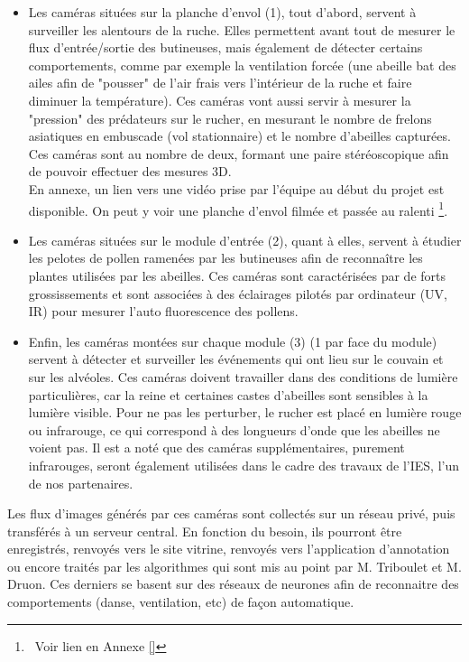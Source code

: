 \documentclass[11pt,french,a4paper]{report}
\begin{document}
\begin{itemize}
  \item Les caméras situées sur la planche d'envol (1), tout d'abord, servent à surveiller 
  les alentours de la ruche. Elles permettent avant tout de
  mesurer le flux d'entrée/sortie des butineuses, mais également de détecter
  certains comportements, comme par exemple la ventilation forcée (une abeille
  bat des ailes afin de "pousser" de l'air frais vers l'intérieur de la ruche et faire
  diminuer la température). Ces caméras vont aussi servir à mesurer la
  "pression" des prédateurs sur le rucher, en mesurant le nombre de frelons
  asiatiques en embuscade (vol stationnaire) et le nombre d'abeilles
  capturées. Ces caméras sont au nombre de deux, formant une paire
  stéréoscopique afin de pouvoir effectuer des mesures 3D. \\
  En annexe, un lien vers une vidéo prise par l'équipe au début du projet est disponible. 
  On peut y voir une planche d'envol filmée et passée au ralenti \footnote{ Voir lien en Annexe \ref{} }. \\ 
 
  \item Les caméras situées sur le module d'entrée (2), quant à elles, servent à étudier
  les pelotes de pollen ramenées par les butineuses afin de reconnaître les
  plantes utilisées par les abeilles. Ces caméras sont caractérisées par de
  forts grossissements et sont associées à des éclairages pilotés par ordinateur
  (UV, IR) pour mesurer l'auto fluorescence des pollens.

  \item Enfin, les caméras montées sur chaque module (3) (1 par face du module) servent
  à détecter et surveiller les événements qui ont lieu sur le couvain et sur
  les alvéoles. Ces caméras doivent travailler dans des conditions de lumière
  particulières, car la reine et certaines castes d'abeilles sont sensibles à
  la lumière visible. Pour ne pas les perturber, le rucher est placé en
  lumière rouge ou infrarouge, ce qui correspond à des longueurs d'onde que les
  abeilles ne voient pas. Il est a noté que des caméras supplémentaires,
  purement infrarouges, seront également utilisées dans le cadre des travaux de
  l'IES, l'un de nos partenaires.
\end{itemize}

  Les flux d'images générés par ces caméras sont collectés sur un réseau privé,
  puis transférés à un serveur central. En fonction du besoin, ils pourront
  être enregistrés, renvoyés vers le site vitrine, renvoyés vers l'application d'annotation
  ou encore traités par les algorithmes qui sont mis au point par M. Triboulet et M. Druon. 
  Ces derniers se basent sur des réseaux de neurones afin de reconnaitre des comportements
  (danse, ventilation, etc) de façon automatique. \\
\end{document}
